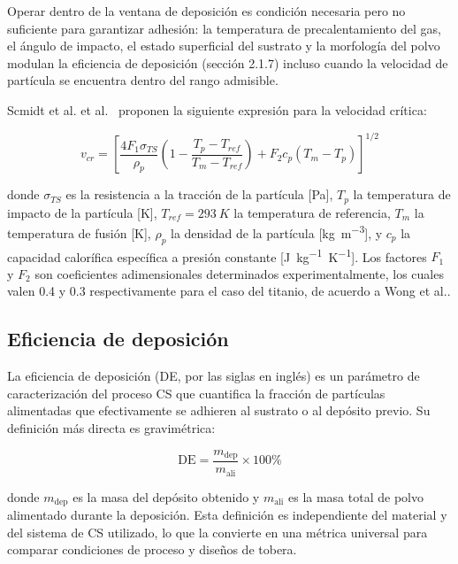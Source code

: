 Operar dentro de la ventana de deposición 
es condición necesaria pero no suficiente para garantizar adhesión: 
la temperatura de precalentamiento del gas, el ángulo de impacto, 
el estado superficial del sustrato y la morfología del polvo modulan 
la eficiencia de deposición (sección 2.1.7) incluso cuando la velocidad de partícula 
se encuentra dentro del rango admisible\cite{Papyrin2007}. 

Scmidt et al. et al.~\cite{Schmidt2006} proponen 
la siguiente expresión para la velocidad crítica:

\begin{equation}
v_{cr} = \left[ \frac{4F_1\sigma_{TS}}{\rho_p} \left(1 - 
\frac{T_p - T_{ref}}{T_m - T_{ref}}\right) + 
F_2 c_p \left(T_m - T_p\right) \right]^{1/2}
\label{vcrit}
\end{equation}

\noindent donde $\sigma_{TS}$ es la resistencia a la tracción de la 
partícula [Pa], $T_p$ la temperatura de impacto de la partícula [K], 
$T_{ref} = \SI{293}{K}$ la temperatura de referencia, $T_m$ la 
temperatura de fusión [K], $\rho_p$ la densidad de la partícula 
[\si{kg.m^{-3}}], y $c_p$ la capacidad calorífica específica a presión 
constante [\si{J.kg^{-1}.K^{-1}}]. Los factores $F_1$ y 
$F_2$ son coeficientes adimensionales determinados 
experimentalmente, los cuales valen 0.4 y 0.3 respectivamente para el caso del titanio, de acuerdo a Wong et al.\cite{Wong2013}.

\subsection{Eficiencia de deposición}

La eficiencia de deposición (DE, por las siglas en inglés) es un parámetro de caracterización del proceso
CS que cuantifica la fracción de partículas alimentadas que efectivamente se
adhieren al sustrato o al depósito previo. Su definición más directa es
gravimétrica:

\begin{equation}
	\text{DE} = \frac{m_{\text{dep}}}{m_{\text{ali}}} \times 100\%
\end{equation}


\noindent donde $m_{\text{dep}}$ es la masa del depósito obtenido y
$m_{\text{ali}}$ es la masa total de polvo alimentado durante la deposición.
Esta definición es independiente del material y del sistema de CS utilizado,
lo que la convierte en una métrica universal para comparar condiciones de
proceso y diseños de tobera.

